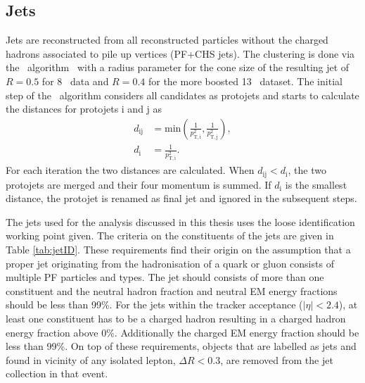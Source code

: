 \subsection{Jets}
Jets are reconstructed  from all reconstructed particles without the charged hadrons associated to pile up vertices (PF+CHS jets). The clustering is done via the \antikt\ algorithm~\cite{Cacciari:2008gp} with a radius parameter for the cone size of the resulting jet of $R=0.5$ for 8 \TeV\ data and $R=0.4$ for the more boosted 13 \TeV\ dataset. The initial step of the \antikt\ algorithm considers all candidates as protojets and starts to calculate the distances for protojets i and j as
\begin{equation}
\begin{aligned}
   d_{\mathrm{ij}} &= \mathrm{min}\left(\frac{1}{p_{\mathrm{T,i}}^2}, \frac{1}{p_{\mathrm{T,j}}^2}\right), \\
   d_{\mathrm{i}} &= \frac{1}{p_{\mathrm{T,i}}^2}.
 \end{aligned}
\end{equation}
For each iteration the two distances are calculated. When $d_{\mathrm{ij}} < d_{\mathrm{i}}$, the two protojets are merged and their four momentum is summed. If $d_{\mathrm{i}}$ is the smallest distance, the protojet is renamed as final jet and ignored in the subsequent steps. 

The jets used for the analysis discussed in this thesis uses the loose identification working point given. The criteria on the constituents of the jets are given in Table \ref{tab:jetID}. These requirements find their origin on the assumption that a proper jet originating from the hadronisation of a quark or gluon consists of multiple PF particles and types. The jet should consists of more than one constituent and the neutral hadron fraction and neutral EM energy fractions should be less than 99\%. For the jets within the tracker acceptance ($|\eta|<2.4$), at least one constituent has to be a charged hadron resulting in a charged hadron energy fraction above 0\%. Additionally the charged EM energy fraction should be less than 99\%. On top of these requirements, objects that are labelled as jets and found in vicinity of any isolated lepton, $\Delta R < 0.3$, are removed from the jet collection in that event. 

